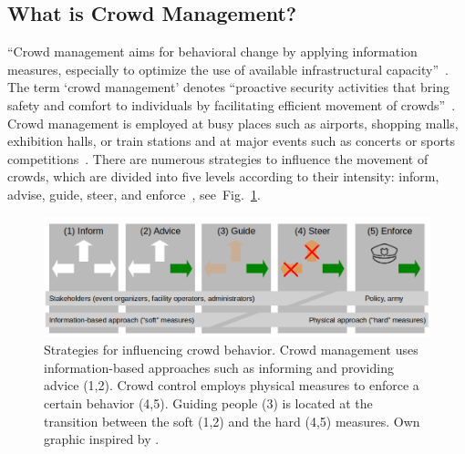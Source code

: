 \label{sec:crowdmanagement}

\subsection{What is Crowd Management?}
\label{sec:crowdcontroldef}
\enquote{Crowd management aims for behavioral change by applying information measures, especially to optimize the use of available infrastructural capacity}~\cite{zomer-2015-cdyn}. 
 The term `crowd management' denotes \enquote{proactive security activities that bring safety and comfort to individuals by facilitating efficient movement of crowds}~\cite[p.3]{feliciani-2021-cdyn}.  Crowd management is employed at busy places such as airports, shopping malls, exhibition halls, or train stations and at major events such as concerts or sports competitions~\cite{feliciani-2021-cdyn}.
There are numerous strategies to influence the movement of crowds, which are divided into five levels according to their intensity: inform,  advise, guide, steer, and enforce~\cite{zomer-2015-cdyn,tertoolen-2012-cdyn}, see~Fig.~\ref{fig:fivestages}.
\begin{figure}[hbt!]
\centering
\includegraphics[width=\textwidth]{../figures/state-of-the-art/crowdmanagement/ficestages.png} 
\caption[Strategies for influencing crowd behavior ]{Strategies for influencing crowd behavior. Crowd management uses information-based approaches such as informing and providing advice (1,2). Crowd control employs physical measures to enforce a certain behavior (4,5). Guiding people (3) is located at the transition between the soft (1,2) and the hard (4,5) measures. Own graphic  inspired by \cite[p.168]{feliciani-2021-cdyn}. }
\label{fig:fivestages}
\end{figure}




